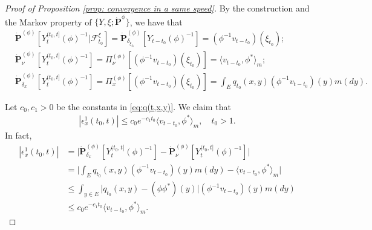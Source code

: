 \documentclass[UTF8]{pkuthss}
\theoremstyle{plain}
\theoremstyle{definition}
\numberwithin{equation}{section}
\begin{document}
\begin{proof}[Proof of Proposition \ref{prop: convergence in a same speed}]
	By the construction and the Markov property of $\{Y,\xi; \dot {\mathbf P}^{\phi}\}$, we have that
\begin{align}
	\label{eq: some equations for PY-1-1}
	&\dot{\mathbf P}^{(\phi)} [Y_t^{(t_0,t]}(\phi)^{-1}|\mathscr F^\xi_{t_0}]
	= \dot{\mathbf P}_{\delta_{\xi_{t_0}}}^{(\phi)}  [Y_{t-t_0}(\phi)^{-1}]
	= (\phi^{-1}v_{t-t_0})(\xi_{t_0});
	\\ \label{eq: some equations for PY-1-2}
	&\dot{\mathbf P}_\nu^{(\phi)}[Y_t^{(t_0,t]}(\phi)^{-1}]
	= \Pi_{\nu}^{(\phi)}[(\phi^{-1}v_{t-t_0})(\xi_{t_0}) ]
	= \langle v_{t-t_0},\phi^* \rangle_m;
	\\ \label{eq: some equations for PY-1-3}
	&\dot{\mathbf P}_{\delta_x}^{(\phi)}[Y_t^{(t_0,t]}(\phi)^{-1}]
	= \Pi_x^{(\phi)}[(\phi^{-1}v_{t-t_0})(\xi_{t_0}) ]
	=  \int_E  q_{t_0}(x,y)(\phi^{-1}v_{t-t_0})(y) m(dy).
\end{align}

	Let  $c_0, c_1>0$ be the constants in \eqref{eq:q(t,x,y)}.
	We claim that
\begin{align}\label{eq: bound for epsilon1}
	|\epsilon_x^1(t_0,t)|
	\leq c_0 e^{-c_1 t_0}\langle v_{t-t_0},\phi^* \rangle_m,
    \quad t_0 > 1.
\end{align}
	In fact,
\begin{align}
	|\epsilon_x^1(t_0,t)|
	& = \big| \dot {\mathbf P}_{\delta_x}^{(\phi)} [Y^{(t_0,t]}_t(\phi)^{-1}] - \dot {\mathbf P}_\nu^{(\phi)} [Y^{(t_0,t]}_t(\phi)^{-1}] \big| \\
	& = \Big|  \int_E  q_{t_0}(x,y)(\phi^{-1}v_{t-t_0})(y) m(dy) - \langle v_{t-t_0},\phi^* \rangle_m \Big|\\
	& \leq \int_{y\in E} \big| q_{t_0}(x,y) - (\phi\phi^*)(y) \big| (\phi^{-1}v_{t-t_0})(y) m(dy)\\
	& \leq c_0 e^{-c_1 t_0}\langle v_{t-t_0},\phi^* \rangle_m .
\end{align}


\end{proof}
\end{document}
